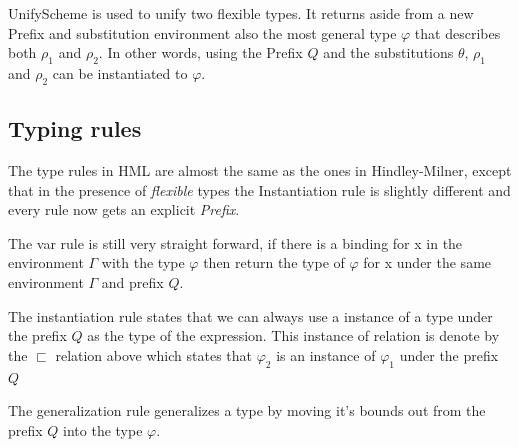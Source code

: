 \documentclass[12pt, a4paper, oneside]{article}
\begin{document}
UnifyScheme is used to unify two flexible types. It returns aside from a new Prefix and substitution environment also the most general type $\varphi$ that describes both $\rho_1$ and $\rho_2$. In other words, using the Prefix $Q$ and the substitutions $\theta$, $\rho_1$ and $\rho_2$ can be instantiated to $\varphi$.

\subsection{Typing rules}
The type rules in HML are almost the same as the ones in Hindley-Milner, except that in the presence of \textit{flexible} types the Instantiation rule is slightly different and every rule now gets an explicit \textit{Prefix}. 

\begin{prooftree}
\end{prooftree}

The var rule is still very straight forward, if there is a binding for x in the environment $\Gamma$ with the type $\varphi$ then return the type of $\varphi$ for x under the same environment $\Gamma$ and prefix $Q$.

\begin{prooftree}
\end{prooftree}

The instantiation rule states that we can always use a instance of a type under the prefix $Q$ as the type of the expression. This instance of relation is denote by the $\sqsubset$ relation above which states that $\varphi_2$ is an instance of $\varphi_1$ under the prefix $Q$

\begin{prooftree}
\end{prooftree}

The generalization rule generalizes a type by moving it's bounds out from the prefix $Q$ into the type $\varphi$.

\begin{prooftree}
\end{prooftree}
\end{document}
